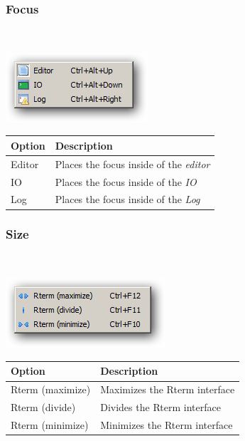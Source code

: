 \hypertarget{menu_r_rterm_focus}{}
\subsubsection{Focus}\\

\includegraphics[scale=0.50]{./res/menu_r_rterm_focus.png}\\

\begin{scriptsize}\begin{tabularx}{\textwidth}{>{\hsize=0.3\hsize}X>{\hsize=0.7\hsize}X}\\
    \hline
    \textbf{Option} & \textbf{Description} \\
    \hline
    Editor & Places the focus inside of the \textit{editor} \\
    IO & Places the focus inside of the \textit{IO} \\
    Log & Places the focus inside of the \textit{Log} \\
    \hline
  \end{tabularx}\end{scriptsize}


\hypertarget{menu_r_rterm_size}{}
\subsubsection{Size}\\

\includegraphics[scale=0.50]{./res/menu_r_rterm_size.png}\\

\begin{scriptsize}\begin{tabularx}{\textwidth}{>{\hsize=0.3\hsize}X>{\hsize=0.7\hsize}X}\\
    \hline
    \textbf{Option} & \textbf{Description} \\
    \hline
    Rterm (maximize) & Maximizes the Rterm interface \\
    Rterm (divide) & Divides the Rterm interface \\
    Rterm (minimize) & Minimizes the Rterm interface \\
    \hline
  \end{tabularx}\end{scriptsize}


